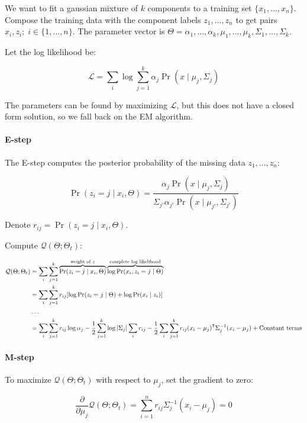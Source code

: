\documentclass{idc_msc}
\renewcommand{\T}{{\mathpalette\raiseT\intercal}} %
\begin{document}
We want to fit a gaussian mixture of \(k\) components to a training set \(\{x_1,\ldots,x_n\}\).
Compose the training data with the component labels \(z_1,\ldots,z_n\) to get pairs \(x_i, z_i;\; i \in \{1,\ldots,n\}\).
The parameter vector is \(\Theta = \alpha_1,\ldots,\alpha_k,\mu_1,\ldots,\mu_k,\Sigma_1, \ldots, \Sigma_k\).

Let the log likelihood be:

\[\mathcal{L} = \sum_i \log \sum_{j=1}^k \alpha_j \Pr(x \mid \mu_j, \Sigma_j)\]

The parameters can be found by maximizing \(\mathcal{L}\), but this does not have a closed form solution, so we fall back on the EM algorithm.

\paragraph{E-step}
The E-step computes the posterior probability of the missing data \(z_1,\ldots,z_n\):

\[
  \Pr(z_i = j \mid x_i, \Theta) = \frac{\alpha_j \Pr(x \mid \mu_j, \Sigma_j)}{\Sigma_{j'}\alpha_{j'} \Pr(x \mid \mu_{j'}, \Sigma_{j'})}
\]

Denote \(r_{ij} = \Pr(z_i = j \mid x_i, \Theta)\).

Compute \(\mathcal{Q}(\Theta;\Theta_t)\):

\[
\begin{aligned}
\mathcal{Q}(\Theta;\Theta_t) &= \sum_i \sum_{j=1}^k \overbrace{\Pr(z_i = j \mid x_i, \Theta)}^{\text{weight of \(z\)}} \overbrace{\log \Pr(x_i, z_i = j \mid \Theta)}^{\text{complete log likelihood}} \\
&= \sum_i \sum_{j=1}^k r_{ij}[\log \Pr(z_i = j \mid \Theta) + \log \Pr(x_i \mid z_i)] \\
&\ldots \\
&= \sum_i \sum_{j=1}^k r_{ij}\log \alpha_j - \frac{1}{2} \sum_{j=1}^k \log |\Sigma_j| \sum_i r_{ij} - \frac{1}{2}\sum_i \sum_{j=1}^k r_{ij}(x_i - \mu_j)^\T \Sigma_j^{-1}(x_i - \mu_j) + \text{Constant terms}
\end{aligned}
\]

\paragraph{M-step}

To maximize \(\mathcal{Q}(\Theta; \Theta_t)\) with respect to \(\mu_j\), set the gradient to zero:

\[\frac{\partial}{\partial \mu_j} \mathcal{Q}(\Theta; \Theta_t) = \sum_{i=1}^n r_{ij} \Sigma_j^{-1}(x_i - \mu_j) = 0\]
\end{document}
